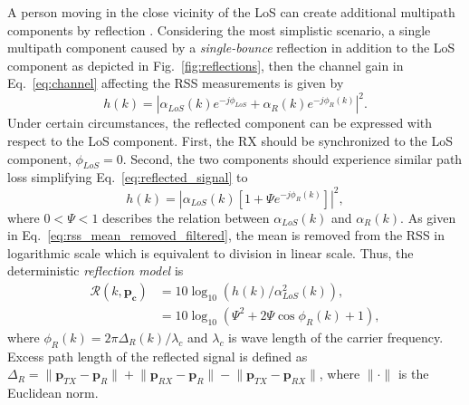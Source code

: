 \documentclass[journal, 10pt, twocolumn, balance]{IEEEtran}
\begin{document}
A person moving in the close vicinity of the LoS can create additional multipath components by reflection \cite{patwari2011b,Liberti1996}. Considering the most simplistic scenario, a single multipath component caused by a \emph{single-bounce} reflection in addition to the LoS component as depicted in Fig.~\ref{fig:reflections}, then the channel gain in Eq.~\eqref{eq:channel} affecting the RSS measurements is given by
\begin{equation}\label{eq:reflected_signal}
	h(k) = \left|\alpha_{LoS}(k)e^{-j\phi_{LoS}} + \alpha_R(k) e^{-j\phi_R(k)}\right|^2.
\end{equation}
Under certain circumstances, the reflected component can be expressed with respect to the LoS component. First, the RX should be synchronized to the LoS component, $\phi_{LoS} = 0$. Second, the two components should experience similar path loss simplifying Eq.~\eqref{eq:reflected_signal} to
\begin{equation}
	h(k) = \left|\alpha_{LoS}(k)\left[1 + \Psi e^{-j\phi_R(k)}\right] \right|^2,
\end{equation}
where $0<\Psi<1$ describes the relation between $\alpha_{LoS}(k)$ and $\alpha_{R}(k)$. As given in Eq.~\eqref{eq:rss_mean_removed_filtered}, the mean is removed from the RSS in logarithmic scale which is equivalent to division in linear scale. Thus, the deterministic \emph{reflection model} is
\begin{equation}\label{eq:reflection_model}
\begin{aligned}
\mathcal{R}(k, \boldsymbol{p_c}) &= 10 \log_{10} \left(h(k)/\alpha_{LoS}^2(k)\right), \\
			       &= 10 \log_{10} \left(\Psi^2 + 2 \Psi\cos\phi_R(k)  +1 \right),
\end{aligned}
\end{equation}
where $\phi_R(k) = 2\pi\Delta_R(k)/\lambda_c$ and $\lambda_c$ is wave length of the carrier frequency. Excess path length of the reflected signal is defined as $\Delta_R = \lVert \boldsymbol{p}_{TX} - \boldsymbol{p}_{R}\rVert + \lVert \boldsymbol{p}_{RX} - \boldsymbol{p}_{R}\rVert - \lVert \boldsymbol{p}_{TX} - \boldsymbol{p}_{RX}\rVert$, where $\lVert \cdot \rVert$ is the Euclidean norm. 
\end{document}
